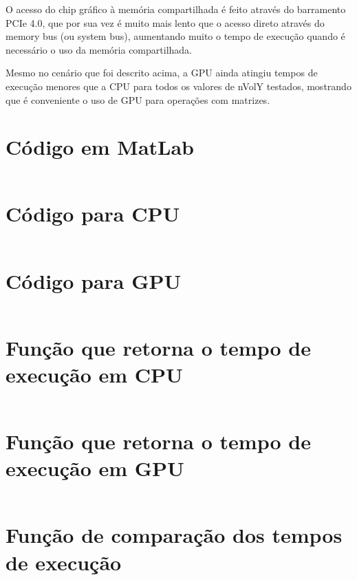 \documentclass[12pt,a4paper]{article}
\begin{document}
O acesso do chip gráfico à memória compartilhada é feito através do barramento PCIe 4.0, que por sua vez é muito mais lento que o acesso direto através do memory bus (ou system bus), aumentando muito o tempo de execução quando é necessário o uso da memória compartilhada.

Mesmo no cenário que foi descrito acima, a GPU ainda atingiu tempos de execução menores que a CPU para todos os valores de nVolY testados, mostrando que é conveniente o uso de GPU para operações com matrizes.

\newpage

\appendix

\section{Código em MatLab}

\inputminted{octave}{cfd_on_gpu/aula15_exercicio_VolumesFinitos_Poiseuille_Flow_2D.m}

\newpage

\section{Código para CPU}

\inputminted{python}{cfd_on_gpu/aula15_exercicio_VolumesFinitos_Poiseuille_Flow_2D.py}

\newpage

\section{Código para GPU}

\inputminted{python}{cfd_on_gpu/aula15_exercicio_VolumesFinitos_Poiseuille_Flow_2D_GPU.py}

\newpage

\section{Função que retorna o tempo de execução em CPU}

\inputminted{python}{cfd_on_gpu/compare/cpu.py}

\newpage

\section{Função que retorna o tempo de execução em GPU}

\inputminted{python}{cfd_on_gpu/compare/gpu.py}

\newpage

\section{Função de comparação dos tempos de execução}

\inputminted{python}{cfd_on_gpu/compare/app.py}
\end{document}
